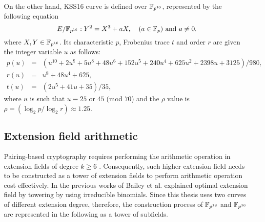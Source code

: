 On the other hand, KSS16 curve is defined over $\mathbb{F}_{p^{16}}$, represented by the following equation
\begin{equation}\label{eq:KSS_16}
E/\mathbb{F}_{p^{16}}:Y^2=X^3+aX, \quad \mbox{($a \in {\mathbb{F}}_{p}$) and  $a \neq 0$},
\end{equation}
 where $X,Y \in \mathbb{F}_{p^{16}}$. Its characteristic $p$, Frobenius trace $t$ and order $r$ are given the integer variable $u$ as follows:
\begin{subequations}
\begin{eqnarray}
p(u) &= & (u^{10} +2u^9 +5u^8 +48u^6 +152u^5 +240u^4 +625u^2 +2398u+3125)/980,  \\\label{eq:kss_16_char}
r(u) &= & u^8 +48u^4 +625,\label{eq:kss_16_degree}  \\
t(u) &=& (2u^5 +41u+35)/35, \label{eq:kss_16_trace} 
\end{eqnarray}
\end{subequations} 
where $u$ is such that $u \equiv 25$ or $45$ (mod $70$) and the $\rho$ value is $\rho = (\log_2 p/\log_2 r) \approx 1.25$.

%



\subsection{Extension field arithmetic}
Pairing-based cryptography requires  performing the arithmetic operation in extension fields of degree $k \geq 6$ \cite{Silverman}. Consequently, such higher extension field needs to be constructed as a tower of extension fields \cite{EPRINT:BenSco09} to perform arithmetic operation cost effectively. In the previous works of Bailey et al. \cite{JC:BaiPaa01} explained optimal extension field by towering by using irreducible binomials. Since this thesis uses two curves of different extension degree, therefore, the construction process of $\mathbb{F}_{p^{18}}$ and $\mathbb{F}_{p^{16}}$ are represented in the following as a tower of subfields. 

